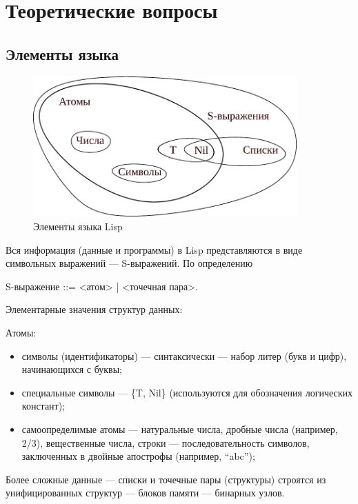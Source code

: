 \documentclass[a4paper,oneside,14pt]{extarticle}
\begin{document}
\newpage
\section{Теоретические вопросы}

\subsection{Элементы языка}

\begin{figure}[H]
	\centering
    \includegraphics[width=0.9\textwidth]{img/lisp.pdf}
	\caption{Элементы языка Lisp}
	\label{fig:lisp}
\end{figure}

Вся информация (данные и программы) в Lisp представляются в виде символьных выражений --- S-выражений. По определению

{S-выражение ::= <атом> | <точечная пара>}.

\noindent Элементарные значения структур данных:

Атомы:
\begin{itemize}
    \item символы (идентификаторы) --- синтаксически --- набор литер (букв и цифр), начинающихся с буквы;
    \item специальные символы --- \{T, Nil\} (используются для обозначения логических констант);
    \item самоопределимые атомы --- натуральные числа, дробные числа (например, 2/3), вещественные числа, строки --- последовательность символов, заключенных в двойные апострофы (например, ``abc'');
\end{itemize}

Более сложные данные --- списки и точечные пары (структуры) строятся из унифицированных структур --- блоков памяти --- бинарных узлов.
\end{document}
